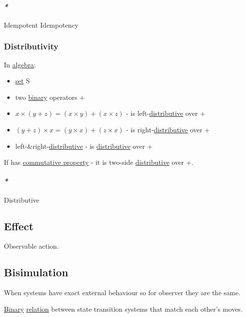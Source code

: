 \documentclass[a4paper,14pt,oneside]{book}
\begin{document}
\paragraph{\emph{*}}
\label{sec:org2d16b6f}

\label{org7cc98b4}Idempotent
\label{org5189396}Idempotency

\subsubsection{\label{orgff0832a}Distributivity}
\label{sec:org54a4586}
In \hyperref[orge0811f7]{algebra}:
\begin{itemize}
\item \hyperref[orgb802935]{set} S
\item two \hyperref[org8653715]{binary} operators + \texttimes{}

\item \(x \times (y + z) = (x \times y) + (x \times z)\) - \texttimes{} is left-\hyperref[orgbffef58]{distributive} over +
\item \((y + z) \times x = (y \times x) + (z \times x)\) - \texttimes{} is right-\hyperref[orgbffef58]{distributive} over +
\item left-\&right-\hyperref[orgbffef58]{distributive} - \texttimes{} is \hyperref[orgbffef58]{distributive} over +
\end{itemize}

If \texttimes{} has \hyperref[org2ef457a]{commutative property} - it is two-side \hyperref[orgbffef58]{distributive} over +.

\paragraph{\emph{*}}
\label{sec:org0216ab6}

\label{orgbffef58}Distributive

\subsection{\label{orgdfaf867}Effect}
\label{sec:orgb660b11}
Observable action.

\subsection{\label{org94f168b}Bisimulation}
\label{sec:orgdc3d571}
When systems have exact external behaviour so for observer they are the same.

\hyperref[org8653715]{Binary} \hyperref[org475f47e]{relation} between state transition systems that match each other's moves.
\end{document}
